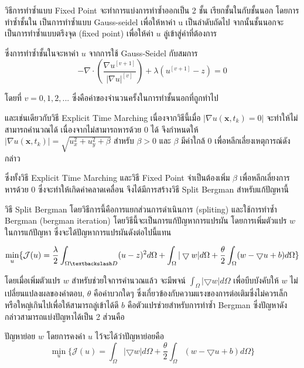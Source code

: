 \documentclass[hidelinks,a4paper,14pt]{article}
\numberwithin{equation}{section}							%
\begin{document}
{		%
		วิธีการทำซ้ำแบบ Fixed Point \cite{ref:FixpointSolver} จะทำการแบ่งการทำซ้ำออกเป็น  2 ชั้น เรียกชั้นในกับชั้นนอก โดยการทำซ้ำชั้นใน เป็นการทำซ้ำแบบ Gauss-seidel เพื่อให้หาค่า u เป็นลำดับถัดไป จากนั้นชั้นนอกจะเป็นการทำซ้ำแบบตรึงจุด (fixed point) เพื่อให้ค่า $u$ ลู่เข้าสู่ค่าที่ต้องการ 
		
		ซึ่งการทำซ้ำชั้นในจะหาค่า $u$ จากการใช้ Gauss-Seidel กับสมการ
		$$
		- \nabla\cdot\left(\frac{\nabla u^{[v+1]}}{{\lvert \nabla u \rvert}^{[v]} }\right) + \lambda(u^{[v+1]}-z)  = 0
		$$
		
		โดยที่ $v = 0,1,2,... $ ซึ่งคือค่าของจำนวนครั้งในการทำชั้นนอกที่ถูกทำไป
		
		และเช่นเดียวกับวิธี Explicit Time Marching เนื่องจากวิธีนี้เมื่อ $\lvert \nabla u ( \mathbf{x},t_k) = 0\rvert $ จะทำให้ไม่สามารถคำนวณได้ เนื่องจากไม่สามารถหารด้วย 0 ได้ จึงกำหนดให้ $\lvert \nabla u ( \mathbf{x},t_k) \rvert = \sqrt{u_x^2+u_y^2 + \beta}$ สำหรับ $\beta > 0$ และ $\beta$ มีค่าใกล้ 0 เพื่อหลีกเลี่ยงเหตุการณ์ดังกล่าว
		
		ซึ่งทั้งวิธี Explicit Time Marching และวิธี Fixed Point จำเป็นต้องเพิ่ม $\beta$ เพื่อหลีกเลี่ยงการหารด้วย 0 ซึ่งจะทำให้เกิดค่าคลาดเคลื่อน  จึงได้มีการสร้างวิธี Split Bergman สำหรับแก้ปัญหานี้
		
		วิธี Split Bergman \cite{ref:splitbergman-inpaint} โดยวิธีการนี้คือการแยกส่วนการดำเนินการ (spliting) และใช้การทำซ้ำ Bergman (bergman iteration)  โดยวิธีนี้จะเป็นการแก้ปัญหาการแปรผัน โดยการเพิ่มตัวแปร $w$ ในการแก้ปัญหา ซึ่งจะได้ปัญหาการแปรผันดังต่อไปนี้แทน
		
			$$\min_{u} \{ \mathcal{J}(u) = \frac{\lambda}{2} \int_{\Omega \textbackslash D} (u-z)^2 d\Omega +  \int_{\Omega}  |\bigtriangledown w|  d\Omega + \frac{\theta}{2} \int_{\Omega} (w - \bigtriangledown u + b) d\Omega \}$$
			
			โดยเมื่อเพิ่มตัวแปร $w$ สำหรับช่วยใจการคำนวณแล้ว จะมีพจน์ $ \int_{\Omega}  |\bigtriangledown w|  d\Omega$ เพื่อบีบบังคับให้ $w$ ไม่เปลี่ยนแปลงผลของคำตอบ, $\theta$ คือค่าบวกใดๆ ซึ่งเกี่ยวข้องกับความแรงของการต่อเติมซึ่งไม่ควรเล็กหรือใหญ่เกินไปเพื่อให้สามารถลู่เข้าได้ดี $b$ คือตัวแปรช่วยสำหรับการทำซ้ำ Bergman ซึ่งปัญหาดังกล่าวสามารถแบ่งปัญหาได้เป็น 2 ส่วนคือ
			
			ปัญหาย่อย $w$ โดยการคงค่า $u$ ไว้จะได้ว่าปัญหาย่อยคือ
			$$\min_{u} \{ \mathcal{J}(u) =  \int_{\Omega}  |\bigtriangledown w|  d\Omega + \frac{\theta}{2} \int_{\Omega} (w - \bigtriangledown u + b) d\Omega \}$$
			
}
\end{document}
